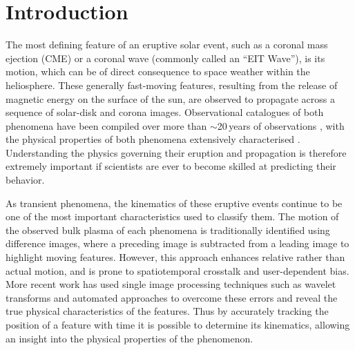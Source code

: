 \documentclass[structabstract]{aa}
\begin{document}
\section{Introduction}
\label{sect_intro}

The most defining feature of an eruptive solar event, such as a coronal mass ejection (CME) or a coronal wave (commonly called an ``EIT Wave''), is its motion, which can be of direct consequence to space weather within the heliosphere. These generally fast-moving features, resulting from the release of magnetic energy on the surface of the sun, are observed to propagate across a sequence of solar-disk and corona images. Observational catalogues of both phenomena have been compiled over more than $\sim$20\,years of observations \citep[e.g.,][]{1985JGR....90..275I,2004JGRA..10907105Y,2009ApJS..183..225T}, with the physical properties of both phenomena extensively characterised \citep[see the recent reviews by e.g., ][]{2011SSRv..158..365G,2012SoPh..tmp...93P,2011ASSL..376.....H,2012LRSP....9....3W}. Understanding the physics governing their eruption and propagation is therefore extremely important if scientists are ever to become skilled at predicting their behavior.

As transient phenomena, the kinematics of these eruptive events continue to be one of the most important characteristics used to classify them. The motion of the observed bulk plasma of each phenomena is traditionally identified using difference images, where a preceding image is subtracted from a leading image to highlight moving features. However, this approach enhances relative rather than actual motion, and is prone to spatiotemporal crosstalk and user-dependent bias. More recent work has used single image processing techniques such as wavelet transforms \citep{2009A&A...495..325B,2012ApJ...752..144M} and automated approaches \citep[e.g.,][]{2011A&A...531A..42L,2012ApJ...752..145B,2012SoPh..276..479P} to overcome these errors and reveal the true physical characteristics of the features. Thus by accurately tracking the position of a feature with time it is possible to determine its kinematics, allowing an insight into the physical properties of the phenomenon. 
\end{document}
